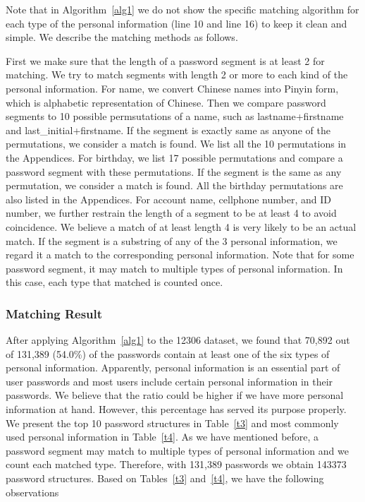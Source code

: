 Note that in Algorithm~\ref{alg1} we do not show the specific matching algorithm for each type of the personal information (line 10 and line 16) to keep it clean and simple. We describe the matching methods as follows.

First we make sure that the length of a password segment is at least 2 for matching. 
We try to match segments with length 2 or more to each kind of the personal information. For name, we convert Chinese names into Pinyin form, which is alphabetic representation of Chinese. Then we compare password segments to 10 possible permsutations of a name, such as lastname+firstname and last\_initial+firstname. If the segment is exactly same as anyone of the permutations, we consider a match is found. We list all the 10 permutations in the Appendices. For birthday, we list 17 possible permutations and compare a password segment with these permutations. If the segment is the same as any permutation, we consider a match is found. All the birthday permutations are also listed in the Appendices. For account name, cellphone number, and ID number, we further restrain the length of a segment to be at least 4 to avoid coincidence. We believe a match of at least length 4 is very likely to be an actual match. If the segment is a substring of any of the 3 personal information, we regard it a match to the corresponding personal information. Note that for some password segment, it may match to multiple types of personal information. In this case, each type that matched is counted once.


\subsubsection{Matching Result}
\label{matchingresult}
After applying Algorithm~\ref{alg1} to the 12306 dataset, we found that 70,892 out of 131,389 (54.0\%) of the passwords contain at least one of the six types of personal information. Apparently, personal information is an essential part of user passwords and most users include certain personal information in their passwords. We believe that the ratio could be higher if we have more personal information at hand. However, this percentage has served its purpose properly. We present the top 10 password structures in Table~\ref{t3} and most commonly used personal information in Table~\ref{t4}. As we have mentioned before, a password segment may match to multiple types of personal information and we count each matched type. Therefore, with 131,389 passwords we obtain 143373 password structures. Based on Tables~\ref{t3} and~\ref{t4}, we have the following observations

